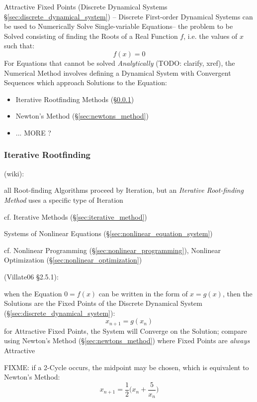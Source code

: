 Attractive Fixed Points (Discrete Dynamical Systems
\S\ref{sec:discrete_dynamical_system}) --
Discrete First-order Dynamical Systems can be used to Numerically Solve
Single-variable Equations-- the problem to be Solved consisting of finding the
Roots of a Real Function $f$, i.e. the values of $x$ such that:
\[
  f(x) = 0
\]
For Equations that cannot be solved \emph{Analytically} (TODO: clarify, xref),
the Numerical Method involves defining a Dynamical System with Convergent
Sequences which approach Solutions to the Equation:
\begin{itemize}
  \item Iterative Rootfinding Methods (\S\ref{sec:iterative_rootfinding})
  \item Newton's Method (\S\ref{sec:newtons_method})
  \item ... MORE ?
\end{itemize}



\subsubsection{Iterative Rootfinding}\label{sec:iterative_rootfinding}

(wiki):

all Root-finding Algorithms proceed by Iteration, but an \emph{Iterative
  Root-finding Method} uses a specific type of Iteration

\fist cf. Iterative Methods (\S\ref{sec:iterative_method})

\fist Systems of Nonlinear Equations
(\S\ref{sec:nonlinear_equation_system})

\fist cf. Nonlinear Programming (\S\ref{sec:nonlinear_programming}), Nonlinear
Optimization (\S\ref{sec:nonlinear_optimization})

(Villate06 \S 2.5.1):

when the Equation $0 = f(x)$ can be written in the form of $x = g(x)$, then the
Solutions are the Fixed Points of the Discrete Dynamical System
(\S\ref{sec:discrete_dynamical_system}):
\[
  x_{n+1} = g(x_n)
\]
for Attractive Fixed Points, the System will Converge on the Solution; compare
using Newton's Method (\S\ref{sec:newtons_method}) where Fixed Points are
\emph{always} Attractive

FIXME:
if a 2-Cycle occurs, the midpoint may be chosen, which is equivalent to Newton's
Method:
\[
  x_{n+1} = \frac{1}{2}\big(x_n + \frac{5}{x_n}\big)
\]



